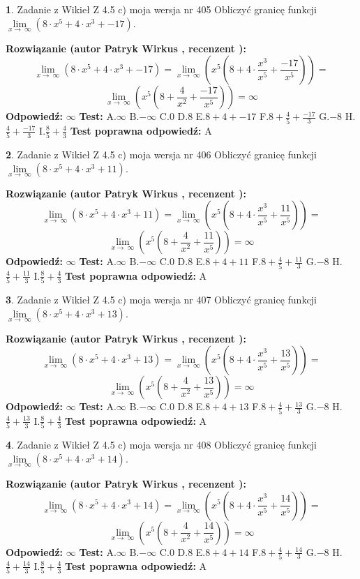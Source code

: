 \documentclass[12pt, a4paper]{article}
\theoremstyle{definition} %
\newtheorem{zad}{}
\newcommand{\zadStart}[1]{\begin{zad}#1\newline}
\newcommand{\zadStop}{\end{zad}}
\newcommand{\rozwStart}[2]{\noindent \textbf{Rozwiązanie (autor #1 , recenzent #2): }\newline}
\newcommand{\rozwStop}{\newline}
\newcommand{\odpStart}{\noindent \textbf{Odpowiedź:}\newline}
\newcommand{\odpStop}{\newline}
\newcommand{\testStart}{\noindent \textbf{Test:}\newline}
\newcommand{\testStop}{\newline}
\newcommand{\kluczStart}{\noindent \textbf{Test poprawna odpowiedź:}\newline}
\newcommand{\kluczStop}{\newline}
\begin{document}
\zadStart{Zadanie z Wikieł Z 4.5 c) moja wersja nr 405}
Obliczyć granicę funkcji  $\lim\limits_{x\to\ \infty}(8 \cdot x^{5}+4 \cdot x^{3}+-17)$.
\zadStop
\rozwStart{Patryk Wirkus}{}
$$\lim\limits_{x\to\ \infty}(8 \cdot x^{5}+4 \cdot x^{3}+-17) = \lim\limits_{x\to\ \infty}(x^{5}(8 +4 \cdot \frac{x^{3}}{x^{5}}+\frac{-17}{x^{5}})) =$$ $$\lim\limits_{x\to\ \infty}(x^{5}(8 +\frac{4}{x^{2}}+\frac{-17}{x^{5}})) =\infty$$
\rozwStop
\odpStart
$\infty$
\odpStop
\testStart
A.$\infty$ B.$-\infty$ C.$0$ D.$8$ E.$8 + 4 + -17$
F.$8+\frac{4}{5}+\frac{-17}{3}$ G.$-8$
H.$\frac{4}{5}+\frac{-17}{3}$
I.$\frac{8}{5}+\frac{4}{3}$
\testStop
\kluczStart
A
\kluczStop



\zadStart{Zadanie z Wikieł Z 4.5 c) moja wersja nr 406}
Obliczyć granicę funkcji  $\lim\limits_{x\to\ \infty}(8 \cdot x^{5}+4 \cdot x^{3}+11)$.
\zadStop
\rozwStart{Patryk Wirkus}{}
$$\lim\limits_{x\to\ \infty}(8 \cdot x^{5}+4 \cdot x^{3}+11) = \lim\limits_{x\to\ \infty}(x^{5}(8 +4 \cdot \frac{x^{3}}{x^{5}}+\frac{11}{x^{5}})) =$$ $$\lim\limits_{x\to\ \infty}(x^{5}(8 +\frac{4}{x^{2}}+\frac{11}{x^{5}})) =\infty$$
\rozwStop
\odpStart
$\infty$
\odpStop
\testStart
A.$\infty$ B.$-\infty$ C.$0$ D.$8$ E.$8 + 4 + 11$
F.$8+\frac{4}{5}+\frac{11}{3}$ G.$-8$
H.$\frac{4}{5}+\frac{11}{3}$
I.$\frac{8}{5}+\frac{4}{3}$
\testStop
\kluczStart
A
\kluczStop



\zadStart{Zadanie z Wikieł Z 4.5 c) moja wersja nr 407}
Obliczyć granicę funkcji  $\lim\limits_{x\to\ \infty}(8 \cdot x^{5}+4 \cdot x^{3}+13)$.
\zadStop
\rozwStart{Patryk Wirkus}{}
$$\lim\limits_{x\to\ \infty}(8 \cdot x^{5}+4 \cdot x^{3}+13) = \lim\limits_{x\to\ \infty}(x^{5}(8 +4 \cdot \frac{x^{3}}{x^{5}}+\frac{13}{x^{5}})) =$$ $$\lim\limits_{x\to\ \infty}(x^{5}(8 +\frac{4}{x^{2}}+\frac{13}{x^{5}})) =\infty$$
\rozwStop
\odpStart
$\infty$
\odpStop
\testStart
A.$\infty$ B.$-\infty$ C.$0$ D.$8$ E.$8 + 4 + 13$
F.$8+\frac{4}{5}+\frac{13}{3}$ G.$-8$
H.$\frac{4}{5}+\frac{13}{3}$
I.$\frac{8}{5}+\frac{4}{3}$
\testStop
\kluczStart
A
\kluczStop



\zadStart{Zadanie z Wikieł Z 4.5 c) moja wersja nr 408}
Obliczyć granicę funkcji  $\lim\limits_{x\to\ \infty}(8 \cdot x^{5}+4 \cdot x^{3}+14)$.
\zadStop
\rozwStart{Patryk Wirkus}{}
$$\lim\limits_{x\to\ \infty}(8 \cdot x^{5}+4 \cdot x^{3}+14) = \lim\limits_{x\to\ \infty}(x^{5}(8 +4 \cdot \frac{x^{3}}{x^{5}}+\frac{14}{x^{5}})) =$$ $$\lim\limits_{x\to\ \infty}(x^{5}(8 +\frac{4}{x^{2}}+\frac{14}{x^{5}})) =\infty$$
\rozwStop
\odpStart
$\infty$
\odpStop
\testStart
A.$\infty$ B.$-\infty$ C.$0$ D.$8$ E.$8 + 4 + 14$
F.$8+\frac{4}{5}+\frac{14}{3}$ G.$-8$
H.$\frac{4}{5}+\frac{14}{3}$
I.$\frac{8}{5}+\frac{4}{3}$
\testStop
\kluczStart
A
\kluczStop
\end{document}
